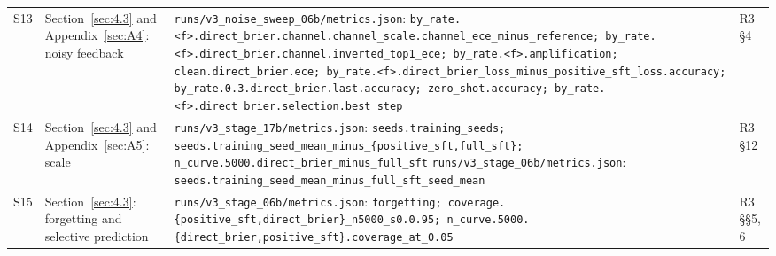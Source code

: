 \documentclass[10pt,letterpaper]{article}
\theoremstyle{plain}
\begin{document}
{\begin{longtable}{@{}p{}>{\raggedright\arraybackslash}p{}>{\raggedright\arraybackslash}p{}>{\raggedright\arraybackslash}p{}@{}}
S13 & Section~\ref{sec:4.3} and Appendix~\ref{sec:A4}: noisy feedback & \texttt{runs/\allowbreak{}v3\_\allowbreak{}noise\_\allowbreak{}sweep\_\allowbreak{}06b/\allowbreak{}metrics.\allowbreak{}json}: \texttt{by\_\allowbreak{}rate.\allowbreak{}\textless{}f\textgreater{}.\allowbreak{}direct\_\allowbreak{}brier.\allowbreak{}channel.\allowbreak{}channel\_\allowbreak{}scale.\allowbreak{}channel\_\allowbreak{}ece\_\allowbreak{}minus\_\allowbreak{}reference;\allowbreak{} by\_\allowbreak{}rate.\allowbreak{}\textless{}f\textgreater{}.\allowbreak{}direct\_\allowbreak{}brier.\allowbreak{}channel.\allowbreak{}inverted\_\allowbreak{}top1\_\allowbreak{}ece;\allowbreak{} by\_\allowbreak{}rate.\allowbreak{}\textless{}f\textgreater{}.\allowbreak{}amplification;\allowbreak{} clean.\allowbreak{}direct\_\allowbreak{}brier.\allowbreak{}ece;\allowbreak{} by\_\allowbreak{}rate.\allowbreak{}\textless{}f\textgreater{}.\allowbreak{}direct\_\allowbreak{}brier\_\allowbreak{}loss\_\allowbreak{}minus\_\allowbreak{}positive\_\allowbreak{}sft\_\allowbreak{}loss.\allowbreak{}accuracy;\allowbreak{} by\_\allowbreak{}rate.\allowbreak{}0.\allowbreak{}3.\allowbreak{}direct\_\allowbreak{}brier.\allowbreak{}last.\allowbreak{}accuracy;\allowbreak{} zero\_\allowbreak{}shot.\allowbreak{}accuracy;\allowbreak{} by\_\allowbreak{}rate.\allowbreak{}\textless{}f\textgreater{}.\allowbreak{}direct\_\allowbreak{}brier.\allowbreak{}selection.\allowbreak{}best\_\allowbreak{}step} & R3 \S4 \\
S14 & Section~\ref{sec:4.3} and Appendix~\ref{sec:A5}: scale & \texttt{runs/\allowbreak{}v3\_\allowbreak{}stage\_\allowbreak{}17b/\allowbreak{}metrics.\allowbreak{}json}: \texttt{seeds.\allowbreak{}training\_\allowbreak{}seeds;\allowbreak{} seeds.\allowbreak{}training\_\allowbreak{}seed\_\allowbreak{}mean\_\allowbreak{}minus\_\allowbreak{}\{positive\_\allowbreak{}sft,full\_\allowbreak{}sft\};\allowbreak{} n\_\allowbreak{}curve.\allowbreak{}5000.\allowbreak{}direct\_\allowbreak{}brier\_\allowbreak{}minus\_\allowbreak{}full\_\allowbreak{}sft} \newline \texttt{runs/\allowbreak{}v3\_\allowbreak{}stage\_\allowbreak{}06b/\allowbreak{}metrics.\allowbreak{}json}: \texttt{seeds.\allowbreak{}training\_\allowbreak{}seed\_\allowbreak{}mean\_\allowbreak{}minus\_\allowbreak{}full\_\allowbreak{}sft\_\allowbreak{}seed\_\allowbreak{}mean} & R3 \S12 \\
S15 & Section~\ref{sec:4.3}: forgetting and selective prediction & \texttt{runs/\allowbreak{}v3\_\allowbreak{}stage\_\allowbreak{}06b/\allowbreak{}metrics.\allowbreak{}json}: \texttt{forgetting;\allowbreak{} coverage.\allowbreak{}\{positive\_\allowbreak{}sft,direct\_\allowbreak{}brier\}\_\allowbreak{}n5000\_\allowbreak{}s0.\allowbreak{}0.\allowbreak{}95;\allowbreak{} n\_\allowbreak{}curve.\allowbreak{}5000.\allowbreak{}\{direct\_\allowbreak{}brier,positive\_\allowbreak{}sft\}.\allowbreak{}coverage\_\allowbreak{}at\_\allowbreak{}0.\allowbreak{}05} & R3 \S\S5, 6 \\

\end{longtable}}
\end{document}
